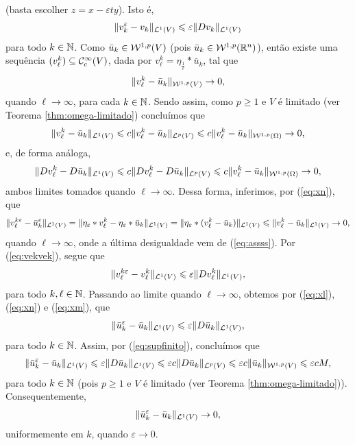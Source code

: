 \begin{prf}
\[\begin{aligned}
        \end{aligned}
    \]
    (basta escolher $z = x - \varepsilon t y$).
    Isto é,
    \begin{equation} \label{eq:vekvek}
        \Vert v_k^\varepsilon - v_k \Vert_{\mathcal{L}^1(V)} \leqslant \varepsilon \Vert Dv_k \Vert_{\mathcal{L}^1(V)}
    \end{equation}
    para todo $k \in \mathbb{N}$. Como $\bar u_k \in \mathcal{W}^{1,p}(V) $ (pois $\bar u_k \in \mathcal{W}^{1,p}(\mathbb{R}^n)$), então existe uma sequência $(v^k_\ell) \subseteq \mathcal{C}^{\infty}_c(V)$, dada por $v^k_\ell = \eta_{\frac{1}{\ell}} * \bar{u}_k$, tal que
    \[
        \Vert v^k_\ell - \bar{u}_k \Vert_{\mathcal{W}^{1,p}(V)} \to 0,
    \]
    quando $\ell \to \infty$, para cada $k \in \mathbb{N}$.
    Sendo assim, como $p \geqslant 1$ e $V$ é limitado (ver Teorema \ref{thm:omega-limitado}) concluímos que
    \begin{equation} \label{eq:xl}
        \Vert v^k_\ell - \bar{u}_k \Vert_{\mathcal{L}^1(V)} \leqslant c \Vert v^k_\ell - \bar{u}_k \Vert_{\mathcal{L}^p(V)} \leqslant c \Vert v^k_\ell - \bar{u}_k \Vert_{\mathcal{W}^{1,p}(\Omega)} \to 0,
    \end{equation}
    e, de forma análoga,
    \begin{equation} \label{eq:xn}
        \Vert Dv^k_\ell - D\bar{u}_k \Vert_{\mathcal{L}^1(V)}\leqslant c \Vert Dv^k_\ell - D\bar{u}_k \Vert_{\mathcal{L}^p(V)} \leqslant c \Vert v^k_\ell - \bar{u}_k \Vert_{\mathcal{W}^{1,p}(\Omega)} \to 0,
    \end{equation}
    ambos limites tomados quando $\ell \to \infty$. Dessa forma, inferimos, por (\ref{eq:xn}), que
    \begin{equation} \label{eq:xm}
        \Vert v^{k\varepsilon}_\ell - \bar u_k^{\varepsilon} \Vert_{\mathcal{L}^1(V)} = \Vert \eta_\varepsilon * v^k_\ell - \eta_\varepsilon * \bar u_k \Vert_{\mathcal{L}^1(V)} = \Vert \eta_\varepsilon  * (v^k_\ell - \bar u_k) \Vert_{\mathcal{L}^1(V)} \leqslant \Vert v^k_\ell - \bar u_k \Vert_{\mathcal{L}^1(V)} \to 0,
    \end{equation}
    quando $\ell \to \infty$, onde a última desigualdade vem de (\ref{eq:assss}).
    Por (\ref{eq:vekvek}), segue que
    \[
        \Vert v^{k\varepsilon}_\ell - v^k_\ell \Vert_{\mathcal{L}^1(V)} \leqslant \varepsilon \Vert D v^k_\ell \Vert_{\mathcal{L}^1(V)},
    \]
    para todo $k,\ell \in \mathbb{N}$. Passando ao limite quando $\ell \to \infty$, obtemos por (\ref{eq:xl}), (\ref{eq:xn}) e (\ref{eq:xm}), que
    \[
        \Vert \bar u_k^\varepsilon - \bar u_k \Vert_{\mathcal{L}^1(V)} \leqslant \varepsilon \Vert D\bar u_k \Vert_{\mathcal{L}^1(V)},
    \]
    para todo $k \in \mathbb{N}$. Assim, por (\ref{eq:supfinito}), concluímos que
    \[
        \Vert \bar u_k^\varepsilon - \bar u_k \Vert_{\mathcal{L}^1(V)} \leqslant \varepsilon \Vert D\bar u_k \Vert_{\mathcal{L}^1(V)} \leqslant \varepsilon c \Vert D\bar u_k \Vert_{\mathcal{L}^p(V)} \leqslant \varepsilon c \Vert \bar u_k \Vert_{\mathcal{W}^{1,p}(V)} \leqslant \varepsilon c M,
    \]
    para todo $k \in \mathbb{N}$ (pois $p \geqslant 1$ e $V$ é limitado (ver Teorema \ref{thm:omega-limitado})). Consequentemente,
    \begin{equation} \label{eq:eml1converge2}
        \Vert \bar u_k^\varepsilon - \bar u_k \Vert_{\mathcal{L}^1 (V)} \to 0,
    \end{equation}
    uniformemente em $k$, quando $\varepsilon \to 0$. 
    

\end{prf}
